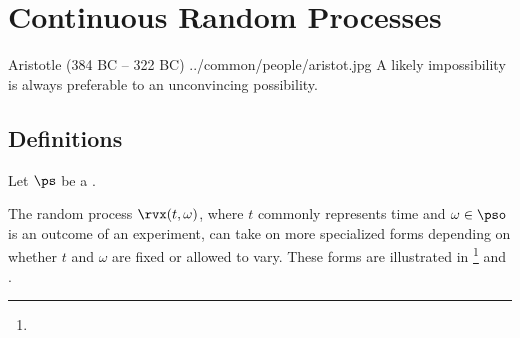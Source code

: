 
\chapter{Continuous Random Processes}
\label{app:random_processes}
\qboxnps
  {Aristotle (384 BC -- 322 BC)
    \footnotemark
  }
  {../common/people/aristot.jpg}
  {A likely impossibility is always preferable to an
  unconvincing possibility.}



\section{Definitions}
\begin{definition}
Let $\ps$ be a .\\
\end{definition}

The random process $\rvx(t,\omega)$, where $t$ commonly represents time
and $\omega\in\pso$ is an outcome of an experiment,
can take on more specialized forms depending on whether
$t$ and $\omega$ are fixed or allowed to vary.
These forms are illustrated in \footnote{}
and .

